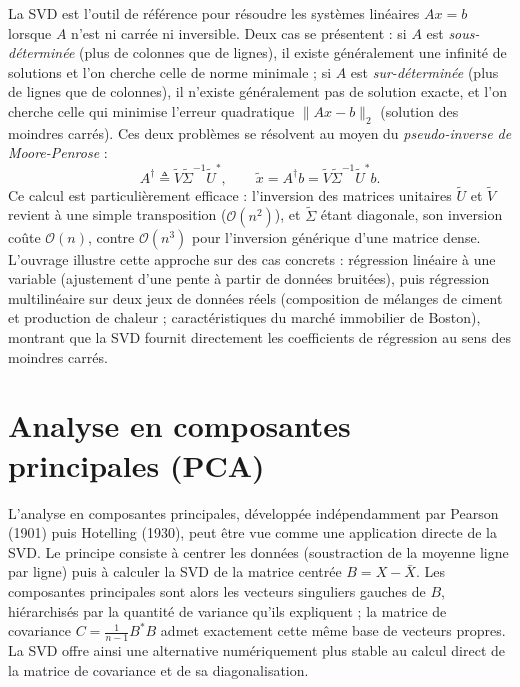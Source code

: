 \documentclass[11pt,a4paper]{article}
\begin{document}
La SVD est l'outil de référence pour résoudre les systèmes linéaires $Ax=b$ lorsque $A$ n'est ni carrée ni inversible. Deux cas se présentent : si $A$ est \emph{sous-déterminée} (plus de colonnes que de lignes), il existe généralement une infinité de solutions et l'on cherche celle de norme minimale ; si $A$ est \emph{sur-déterminée} (plus de lignes que de colonnes), il n'existe généralement pas de solution exacte, et l'on cherche celle qui minimise l'erreur quadratique $\|Ax-b\|_2$ (solution des moindres carrés). Ces deux problèmes se résolvent au moyen du \emph{pseudo-inverse de Moore-Penrose} :
\begin{equation}
A^{\dagger} \triangleq \tilde V \tilde \Sigma^{-1} \tilde U^{*}, \qquad \tilde x = A^{\dagger} b = \tilde V \tilde \Sigma^{-1} \tilde U^{*} b.
\end{equation}
Ce calcul est particulièrement efficace : l'inversion des matrices unitaires $\tilde U$ et $\tilde V$ revient à une simple transposition ($\mathcal O(n^2)$), et $\tilde \Sigma$ étant diagonale, son inversion coûte $\mathcal O(n)$, contre $\mathcal O(n^3)$ pour l'inversion générique d'une matrice dense. L'ouvrage illustre cette approche sur des cas concrets : régression linéaire à une variable (ajustement d'une pente à partir de données bruitées), puis régression multilinéaire sur deux jeux de données réels (composition de mélanges de ciment et production de chaleur ; caractéristiques du marché immobilier de Boston), montrant que la SVD fournit directement les coefficients de régression au sens des moindres carrés.

\section{Analyse en composantes principales (PCA)}

L'analyse en composantes principales, développée indépendamment par Pearson (1901) puis Hotelling (1930), peut être vue comme une application directe de la SVD. Le principe consiste à centrer les données (soustraction de la moyenne ligne par ligne) puis à calculer la SVD de la matrice centrée $B = X - \bar X$. Les composantes principales sont alors les vecteurs singuliers gauches de $B$, hiérarchisés par la quantité de variance qu'ils expliquent ; la matrice de covariance $C = \tfrac{1}{n-1}B^{*}B$ admet exactement cette même base de vecteurs propres. La SVD offre ainsi une alternative numériquement plus stable au calcul direct de la matrice de covariance et de sa diagonalisation.
\end{document}
